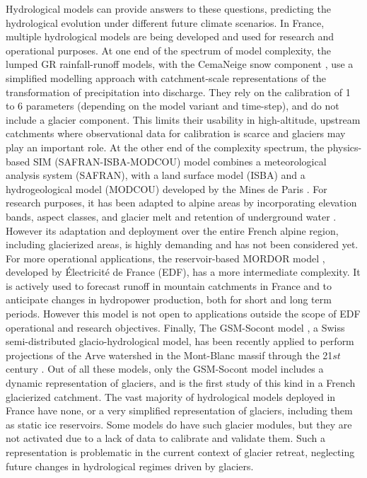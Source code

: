 Hydrological models can provide answers to these questions, predicting the hydrological evolution under different future climate scenarios. In France, multiple hydrological models are being developed and used for research and operational purposes. At one end of the spectrum of model complexity, the lumped GR rainfall-runoff models, with the CemaNeige snow component \citep{coron_suite_2017}, use a simplified modelling approach with catchment-scale representations of the transformation of precipitation into discharge. They rely on the calibration of 1 to 6 parameters (depending on the model variant and time-step), and do not include a glacier component. This limits their usability in high-altitude, upstream catchments where observational data for calibration is scarce and glaciers may play an important role.  At the other end of the complexity spectrum, the physics-based SIM (SAFRAN-ISBA-MODCOU) model combines a meteorological analysis system (SAFRAN), with a land surface model (ISBA) and a hydrogeological model (MODCOU) developed by the Mines de Paris \citep{habets_safran-isba-modcou_2008}. For research purposes, it has been adapted to alpine areas by incorporating elevation bands, aspect classes, and glacier melt and retention of underground water \citep{lafaysse_influence_2011}. However its adaptation and deployment over the entire French alpine region, including glacierized areas, is highly demanding \citep[e.g.][]{lecourt_physically-based_2018} and has not been considered yet. For more operational applications, the reservoir-based MORDOR model \citep{paquet_evolution_2004}, developed by Électricité de France (EDF), has a more intermediate complexity. It is actively  used to forecast runoff in mountain catchments in France and to anticipate changes in hydropower production, both for short and long term periods. However this model is not open to applications outside the scope of EDF operational and research objectives. Finally, The GSM-Socont model \citep{schaefli_conceptual_2005}, a Swiss semi-distributed glacio-hydrological model, has been recently applied to perform projections of the Arve watershed in the Mont-Blanc massif through the 21${st}$ century \citep{laurent_impact_2020}. Out of all these models, only the GSM-Socont model includes a dynamic representation of glaciers, and \citet{laurent_impact_2020} is the first study of this kind in a French glacierized catchment. The vast majority of hydrological models deployed in France have none, or a very simplified representation of glaciers, including them as static ice reservoirs. Some models do have such glacier modules, but they are not activated due to a lack of data to calibrate and validate them. Such a representation is problematic in the current context of glacier retreat, neglecting future changes in hydrological regimes driven by glaciers. 


